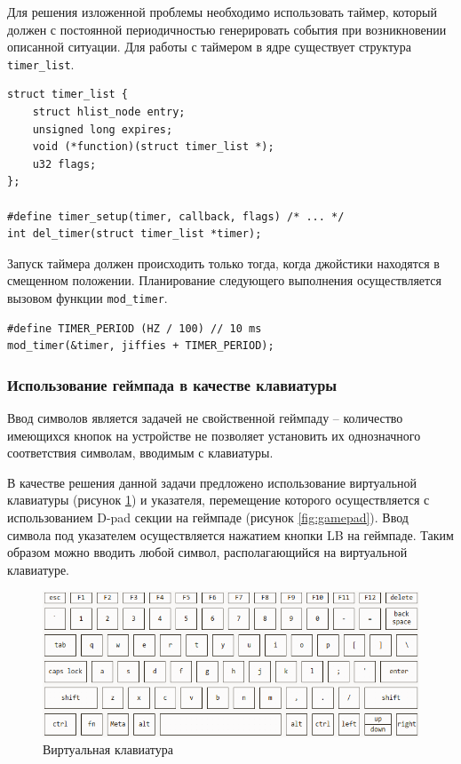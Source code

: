 Для решения изложенной проблемы необходимо использовать таймер, который должен с постоянной периодичностью генерировать события при возникновении описанной ситуации. Для работы с таймером в ядре существует структура \texttt{timer\_list}.

\begin{small}
\begin{verbatim}
struct timer_list {
    struct hlist_node entry;
    unsigned long expires;
    void (*function)(struct timer_list *);
    u32	flags;
};

#define timer_setup(timer, callback, flags) /* ... */
int del_timer(struct timer_list *timer);
\end{verbatim}
\end{small}

Запуск таймера должен происходить только тогда, когда джойстики находятся в смещенном положении. Планирование следующего выполнения осуществляется вызовом функции \texttt{mod\_timer}.

\begin{small}
\begin{verbatim}
#define TIMER_PERIOD (HZ / 100) // 10 ms
mod_timer(&timer, jiffies + TIMER_PERIOD);
\end{verbatim}
\end{small}

\subsubsection{Использование геймпада в качестве клавиатуры}

Ввод символов является задачей не свойственной геймпаду -- количество имеющихся кнопок на устройстве не позволяет установить их однозначного соответствия символам, вводимым с клавиатуры.

В качестве решения данной задачи предложено использование виртуальной клавиатуры (рисунок \ref{fig:virtual-kbd}) и указателя, перемещение которого осуществляется с использованием D-pad секции на геймпаде (рисунок \ref{fig:gamepad}). Ввод символа под указателем осуществляется нажатием кнопки LB на геймпаде. Таким образом можно вводить любой символ, располагающийся на виртуальной клавиатуре.

\begin{figure}[ht]
    \centering
    \includegraphics[width=\linewidth]{img/virtual_keyboard_white.png}
    \caption{Виртуальная клавиатура}
    \label{fig:virtual-kbd}
\end{figure}

